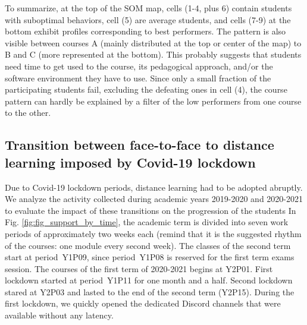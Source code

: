 \documentclass{aims}
\theoremstyle{definition}
\begin{document}
To summarize, at the top of the SOM map, cells (1-4, plus 6) contain
students with suboptimal behaviors, cell (5) are average students, and
cells (7-9) at the bottom exhibit profiles corresponding to best
performers. The pattern is also visible between courses A (mainly
distributed at the top or center of the map) to B and C (more
represented at the bottom). This probably suggests that students need
time to get used to the course, its pedagogical approach, and/or the
software environment they have to use. Since only a small fraction of
the participating students fail, excluding the defeating ones in cell
(4), the course pattern can hardly be explained by a filter of the low
performers from one course to the other.

\hypertarget{transition-between-face-to-face-to-distance-learning-imposed-by-covid-19-lockdown-1}{%
\subsection{Transition between face-to-face to distance learning imposed
by Covid-19
lockdown}\label{transition-between-face-to-face-to-distance-learning-imposed-by-covid-19-lockdown-1}}

Due to Covid-19 lockdown periods, distance learning had to be adopted
abruptly. We analyze the activity collected during academic years
2019-2020 and 2020-2021 to evaluate the impact of these transitions on
the progression of the students In Fig. \ref {fig:fig_support_by_time},
the academic term is divided into seven work periods of approximately
two weeks each (remind that it is the suggested rhythm of the courses:
one module every second week). The classes of the second term start at
period~Y1P09, since period~Y1P08 is reserved for the first term exams
session. The courses of the first term of 2020-2021 begins at Y2P01.
First lockdown started at period~Y1P11 for one month and a half. Second
lockdown stared at Y2P03 and lasted to the end of the second term
(Y2P15). During the first lockdown, we quickly opened the dedicated
Discord channels that were available without any latency.
\end{document}
